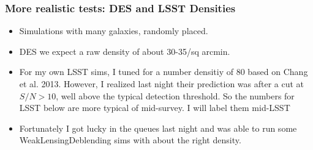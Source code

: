 \documentclass{beamer}
\begin{document}
\frame
{
    \frametitle{More realistic tests:  DES and LSST Densities}

 
    \begin{itemize}

        \item Simulations with many galaxies, randomly placed.

        \item DES we expect a raw density of about 30-35/sq arcmin.

        \item For my own LSST sims, I tuned for a number densitiy of 80 based
            on Chang et al. 2013.  However, I realized last night their
            prediction was after a cut at $S/N > 10$, well above the typical
            detection threshold.  So the numbers for LSST below are more
            typical of mid-survey.  I will label them mid-LSST
            
        \item Fortunately I got lucky in the queues last night and was able to
            run some WeakLensingDeblending sims with about the right density.

    \end{itemize}
}
\end{document}
